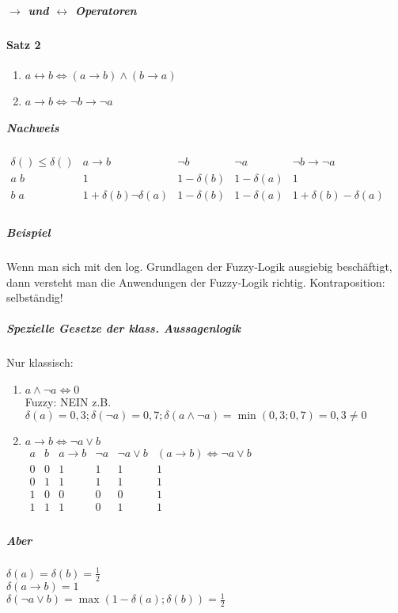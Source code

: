 \documentclass[a4paper]{scrartcl}
\begin{document}
\subparagraph{$\rightarrow$ und $\leftrightarrow$ Operatoren}
\paragraph{Satz 2}
\begin{enumerate}
\item $a \leftrightarrow b \Leftrightarrow (a \rightarrow b) \wedge (b \rightarrow a)$
\item $a \rightarrow b \Leftrightarrow \neg b \rightarrow \neg a$
\end{enumerate}

\subparagraph{Nachweis}
$\begin{array}{c|c|c|c|c}
\delta () \leq \delta () & a \rightarrow b & \neg b & \neg a & \neg b \rightarrow \neg a \\ \hline
a \; b & 1 & 1 - \delta (b) & 1 - \delta (a) & 1 \\
b \; a & 1+ \delta (b) \neg \delta (a) & 1 - \delta (b) &  1- \delta (a) & 1 + \delta (b) - \delta (a)\\
\end{array}$
\subparagraph{Beispiel} Wenn man sich mit den log. Grundlagen der Fuzzy-Logik ausgiebig beschäftigt, dann versteht man die Anwendungen der Fuzzy-Logik richtig. Kontraposition: selbständig!

\subparagraph{Spezielle Gesetze der klass. Aussagenlogik}
Nur klassisch:
\begin{enumerate}
\item $a \wedge \neg a \Leftrightarrow 0$\\
Fuzzy: NEIN z.B. $\delta (a) = 0,3; \delta (\neg a) = 0,7; \delta(a \wedge \neg a) = \min (0,3;0,7) = 0,3 \neq 0$
\item $a \rightarrow b \Leftrightarrow \neg a \vee b$\\
$\begin{array}{c|c|c|c|c|c}
a & b & a \rightarrow b & \neg a & \neg a \vee b & (a \rightarrow b) \Leftrightarrow \neg a \vee b\\ \hline
0 & 0 & 1 & 1 & 1 & 1 \\
0 & 1 & 1 & 1 & 1 & 1 \\
1 & 0 & 0 & 0 & 0 & 1 \\
1 & 1 & 1 & 0 & 1 & 1 \\
\end{array}$
\end{enumerate}
\subparagraph{Aber} $\delta (a) = \delta (b) = \frac{1}{2}$ \\
$ \delta (a \rightarrow b) = 1$\\
$\delta (\neg a \vee b) =  \max (1- \delta (a) ; \delta (b) ) = \frac{1}{2}$
\end{document}
